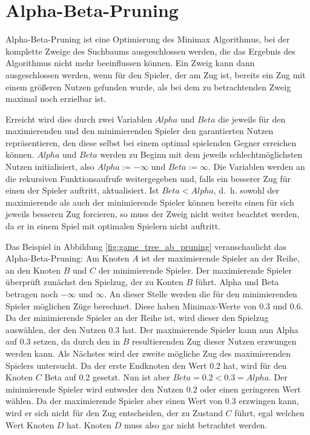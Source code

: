 \section{Alpha-Beta-Pruning}
\label{sec:alphabeta}

Alpha-Beta-Pruning ist eine Optimierung des Minimax Algorithmus, bei der komplette Zweige des Suchbaums ausgeschlossen
werden, die das Ergebnis des Algorithmus nicht mehr beeinflussen können. Ein Zweig kann dann ausgeschlossen werden, wenn
für den Spieler, der am Zug ist, bereits ein Zug mit einem größeren Nutzen gefunden wurde, als bei dem zu betrachtenden Zweig
maximal noch erzielbar ist.

Erreicht wird dies durch zwei Variablen $Alpha$ und $Beta$ die jeweils für den maximierenden und den minimierenden
Spieler den garantierten Nutzen repräsentieren, den diese selbst bei einem optimal spielenden Gegner erreichen können.
$Alpha$ und $Beta$ werden zu Beginn mit dem jeweils schlechtmöglichsten Nutzen initialisiert, also $Alpha := -\infty$ und
$Beta := \infty$. Die Variablen werden an die rekursiven Funktionsaufrufe weitergegeben und, falls ein besserer Zug für
einen der Spieler auftritt, aktualisiert. Ist $Beta < Alpha$, d. h. sowohl der maximierende als auch der minimierende
Spieler können bereits einen für sich jeweils besseren Zug forcieren, so muss der Zweig nicht weiter beachtet werden, da
er in einem Spiel mit optimalen Spielern nicht auftritt.
\cite[S.~167]{ai2010russel}

Das Beispiel in Abbildung \ref{fig:game_tree_ab_pruning} veranschaulicht das Alpha-Beta-Pruning: Am Knoten $A$ ist der
maximierende Spieler an der Reihe, an den Knoten $B$ und $C$ der minimierende Spieler. Der maximierende Spieler
überprüft zunächst den Spielzug, der zu Konten $B$ führt. Alpha und Beta betragen noch $-\infty$ und $\infty$. An dieser
Stelle werden die für den minimierenden Spieler möglichen Züge berechnet. Diese haben Minimax-Werte von $0.3$ und $0.6$.
Da der minimierende Spieler an der Reihe ist, wird dieser den Spielzug auswählen, der den Nutzen $0.3$ hat. Der
maximierende Spieler kann nun Alpha auf 0.3 setzen, da durch den in $B$ resultierenden Zug dieser Nutzen erzwungen
werden kann. Als Nächstes wird der zweite mögliche Zug des maximierenden Spielers untersucht. Da der erste Endknoten den
Wert $0.2$ hat, wird für den Knoten $C$ Beta auf 0.2 gesetzt. Nun ist aber $Beta=0.2<0.3=Alpha$. Der minimierende
Spieler wird entweder den Nutzen $0.2$ oder einen geringeren Wert wählen. Da der maximierende Spieler aber einen Wert
von $0.3$ erzwingen kann, wird er sich nicht für den Zug entscheiden, der zu Zustand $C$ führt, egal welchen Wert Knoten
$D$ hat. Knoten $D$ muss also gar nicht betrachtet werden.

